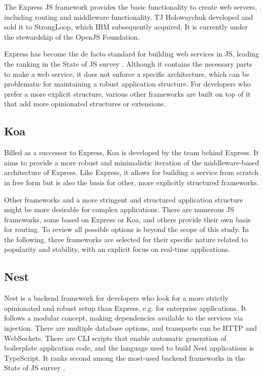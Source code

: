 The Express JS framework provides the basic functionality to create web servers, including routing and middleware functionality. TJ Holowaychuk developed and sold it to StrongLoop, which IBM subsequently acquired. It is currently under the stewardship of the OpenJS Foundation.

Express has become the de facto standard for building web services in JS, leading the ranking in the State of JS survey \parencite{mostUsedBackendFrameworks22}. Although it contains the necessary parts to make a web service, it does not enforce a specific architecture, which can be problematic for maintaining a robust application structure. For developers who prefer a more explicit structure, various other frameworks are built on top of it that add more opinionated structures or extensions.

\subsection{Koa}

Billed as a successor to Express, Koa is developed by the team behind Express. It aims to provide a more robust and minimalistic iteration of the middleware-based architecture of Express. Like Express, it allows for building a service from scratch in free form but is also the basis for other, more explicitly structured frameworks.

Other frameworks and a more stringent and structured application structure might be more desirable for complex applications. There are numerous \ac{JS} frameworks, some based on Express or Koa, and others provide their own basis for routing. To review all possible options is beyond the scope of this study. In the following, three frameworks are selected for their specific nature related to popularity and stability, with an explicit focus on real-time applications.



\subsection{Nest}

Nest is a backend framework for developers who look for a more strictly opinionated and robust setup than Express, e.g. for enterprise applications. It follows a modular concept, making dependencies available to the services via injection. There are multiple database options, and transports can be HTTP and WebSockets. There are \ac{CLI} scripts that enable automatic generation of boilerplate application code, and the language used to build Nest applications is TypeScript. It ranks second among the most-used backend frameworks in the State of JS survey \parencite{mostUsedBackendFrameworks22}.

